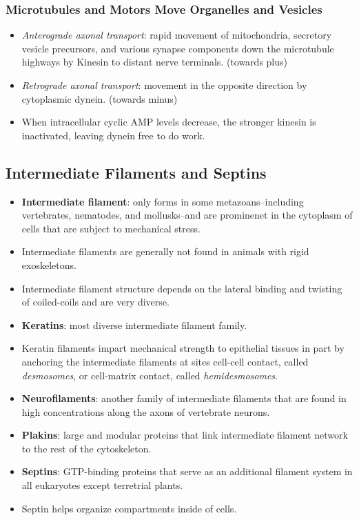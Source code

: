 \documentclass[12pt,a4paper]{article}
\begin{document}
\subsubsection{Microtubules and Motors Move Organelles and Vesicles}
\begin{itemize}
    \item \textit{Anterograde axonal transport}: rapid movement of mitochondria, secretory vesicle precursors, and various synapse components down the microtubule highways by Kinesin to distant nerve terminals. (towards plus)
    \item \textit{Retrograde axonal transport}: movement in the opposite direction by cytoplasmic dynein. (towards minus)
    \item When intracellular cyclic AMP levels decrease, the stronger kinesin is inactivated, leaving dynein free to do work.
\end{itemize}

\subsection{Intermediate Filaments and Septins}
\begin{itemize}
    \item \textbf{Intermediate filament}: only forms in some metazoans--including vertebrates, nematodes, and mollusks--and are prominenet in the cytoplasm of cells that are subject to mechanical stress.
    \item Intermediate filaments are generally not found in animals with rigid exoskeletons.
    \item Intermediate filament structure depends on the lateral binding and twisting of coiled-coils and are very diverse.
    \item \textbf{Keratins}: most diverse intermediate filament family.
    \item Keratin filaments impart mechanical strength to epithelial tissues in part by anchoring the intermediate filaments at sites cell-cell contact, called \textit{desmosomes}, or cell-matrix contact, called \textit{hemidesmosomes}. 
    \item \textbf{Neurofilaments}: another family of intermediate filaments that are found in high concentrations along the axons of vertebrate neurons.
    \item \textbf{Plakins}: large and modular proteins that link intermediate filament network to the rest of the cytoskeleton.
    \item \textbf{Septins}: GTP-binding proteins that serve as an additional filament system in all eukaryotes except terretrial plants.
    \item Septin helps organize compartments inside of cells.
\end{itemize}
\end{document}
